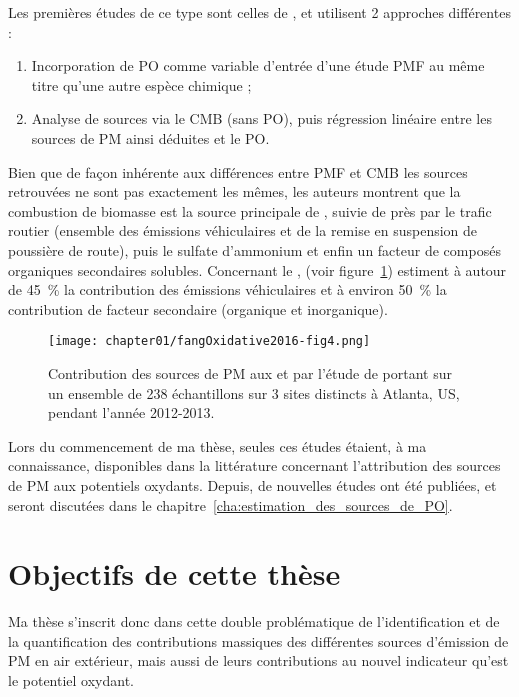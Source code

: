Les premières études de ce type sont celles de
\cite{vermaReactive2014,batesReactive2015,fangOxidative2016}, et utilisent 2 approches
différentes :
\begin{enumerate}
    \item Incorporation de PO comme variable d'entrée d'une étude PMF au même titre qu'une
        autre espèce chimique ;
    \item Analyse de sources via le CMB (sans PO), puis régression linéaire entre les
        sources de PM ainsi déduites et le PO.
\end{enumerate}
Bien que de façon inhérente aux différences entre PMF et CMB les sources retrouvées ne
sont pas exactement les mêmes, les auteurs montrent que la combustion de biomasse est la source
principale de \PODTTv, suivie de près par le trafic routier (ensemble des émissions
véhiculaires et de la remise en suspension de poussière de route), puis le sulfate
d'ammonium et enfin un facteur de composés organiques secondaires solubles.
Concernant le \POAAv, \cite{fangOxidative2016} (voir
figure~\ref{fig:chapter01/fangOxidative2016-fig4}) estiment à autour de \SI{45}{\percent} la
contribution des émissions véhiculaires et à environ \SI{50}{\percent} la contribution de
facteur secondaire (organique et inorganique).

\begin{figure}[ht]
    \centering
    \texttt{[image: chapter01/fangOxidative2016-fig4.png]}
    \caption{Contribution des sources de PM aux \POAAv{} et \PODTTv{} par l'étude de
    \cite{fangOxidative2016} portant sur un ensemble de 238 échantillons sur 3 sites
        distincts à Atlanta, US, pendant l'année 2012-2013.}%
    \label{fig:chapter01/fangOxidative2016-fig4}
\end{figure}

Lors du commencement de ma thèse, seules ces études étaient, à ma connaissance,
disponibles dans la littérature concernant l'attribution des sources de PM aux potentiels
oxydants.  Depuis, de nouvelles études ont été publiées, et seront discutées dans le
chapitre~\ref{cha:estimation_des_sources_de_PO}.


\section{Objectifs de cette thèse}%
\label{sec:positionnement_de_cette_thèse}

Ma thèse s'inscrit donc dans cette double problématique de l'identification et de la
quantification des contributions massiques des différentes sources d'émission de PM en air
extérieur, mais aussi de leurs contributions au nouvel indicateur qu'est le potentiel
oxydant.

